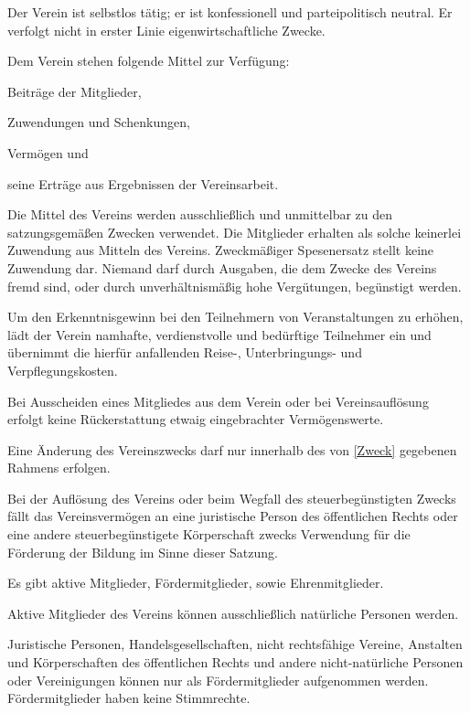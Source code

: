 \documentclass[draft]{scrartcl}
\begin{document}
\begin{contract}
Der Verein ist selbstlos tätig; er ist konfessionell und parteipolitisch
neutral. Er verfolgt nicht in erster Linie eigenwirtschaftliche Zwecke.

Dem Verein stehen folgende Mittel zur Verfügung:

\begin{compactitem}
  \item Beiträge der Mitglieder,
  \item Zuwendungen und Schenkungen,
  \item Vermögen und
  \item seine Erträge aus Ergebnissen der Vereinsarbeit.
\end{compactitem}

Die Mittel des Vereins werden ausschließlich und unmittelbar zu den
satzungsgemäßen Zwecken verwendet. Die Mitglieder erhalten als solche
keinerlei Zuwendung aus Mitteln des Vereins. Zweckmäßiger Spesenersatz stellt
keine Zuwendung dar. Niemand darf durch Ausgaben, die dem Zwecke des Vereins
fremd sind, oder durch unverhältnismäßig hohe Vergütungen, begünstigt werden.

Um den Erkenntnisgewinn bei den Teilnehmern von Veranstaltungen zu erhöhen,
lädt der Verein namhafte, verdienstvolle und bedürftige Teilnehmer ein und
übernimmt die hierfür anfallenden Reise-, Unterbringungs- und
Verpflegungskosten.

Bei Ausscheiden eines Mitgliedes aus dem Verein oder bei Vereinsauf\/lösung
erfolgt keine Rückerstattung etwaig eingebrachter Vermögenswerte.

Eine Änderung des Vereinszwecks darf nur innerhalb des von \ref{Zweck}
gegebenen Rahmens erfolgen.

Bei der Auf\/lösung des Vereins oder beim Wegfall des steuerbegünstigten
Zwecks fällt das Vereinsvermögen an eine juristische Person des öf\-fent\-lichen
Rechts oder eine andere steuerbegünstigete Körperschaft zwecks Verwendung
für die Förderung der Bildung im Sinne dieser Satzung.


Es gibt aktive Mitglieder, Fördermitglieder, sowie Ehrenmitglieder.

Aktive Mitglieder des Vereins können ausschließlich natürliche Personen
werden.

Juristische Personen, Handelsgesellschaften, nicht rechtsfähige Vereine,
Anstalten und Kör\-pers\-chaften des öff\-ent\-lich\-en Rechts und andere
nicht-natürliche Personen oder Vereinigungen können nur als Fördermitglieder
aufgenommen werden. Fördermitglieder haben keine Stimmrechte.


\end{contract}
\end{document}
